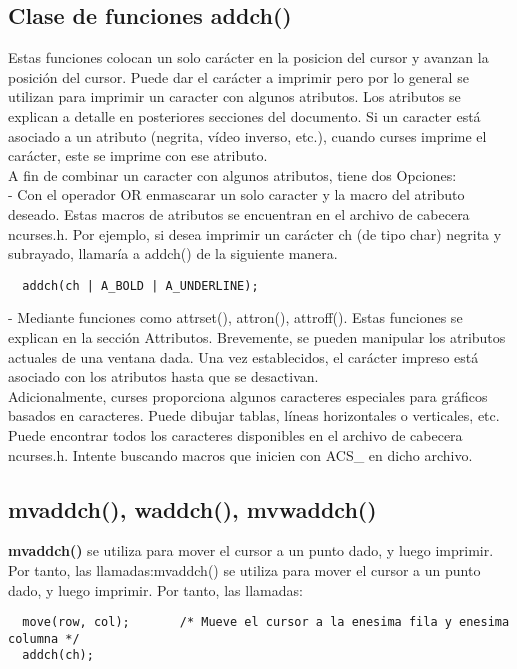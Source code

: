 \documentclass{article}
\begin{document}
\subsection{Clase de funciones addch()}%
Estas funciones colocan un solo carácter en la posicion del cursor y avanzan
la posición del cursor. Puede dar el carácter a imprimir pero por lo general se
utilizan para imprimir un caracter con algunos atributos. Los atributos se
explican a detalle en posteriores secciones del documento. Si un caracter está
asociado a un atributo (negrita, vídeo inverso, etc.), cuando curses imprime el
carácter, este se imprime con ese atributo.\\

A fin de combinar un caracter con algunos atributos, tiene dos Opciones:\\

- Con el operador OR enmascarar un solo caracter y la macro del atributo deseado.
Estas macros de atributos se encuentran en el archivo de cabecera ncurses.h.
Por ejemplo, si desea imprimir un carácter ch (de tipo char) negrita y
subrayado, llamaría a addch() de la siguiente manera.

\begin{verbatim}
  addch(ch | A_BOLD | A_UNDERLINE);
\end{verbatim}

- Mediante funciones como attrset(), attron(), attroff(). Estas funciones se
explican en la sección Attributos. Brevemente, se pueden manipular los
atributos actuales de una ventana dada. Una vez establecidos, el carácter
impreso está asociado con los atributos hasta que se desactivan.\\

Adicionalmente, curses proporciona algunos caracteres especiales para gráficos
basados en caracteres. Puede dibujar tablas, líneas horizontales o
verticales, etc. Puede encontrar todos los caracteres disponibles en el archivo
de cabecera ncurses.h. Intente buscando macros que inicien con ACS\_ en dicho
archivo.

\subsection{mvaddch(), waddch(), mvwaddch()}%
\textbf{mvaddch()} se utiliza para mover el cursor a un punto dado, y luego imprimir.
Por tanto, las llamadas:mvaddch() se utiliza para mover el cursor a un punto
dado, y luego imprimir. Por tanto, las llamadas:

\begin{verbatim}
  move(row, col);       /* Mueve el cursor a la enesima fila y enesima columna */
  addch(ch);
\end{verbatim}
\end{document}
